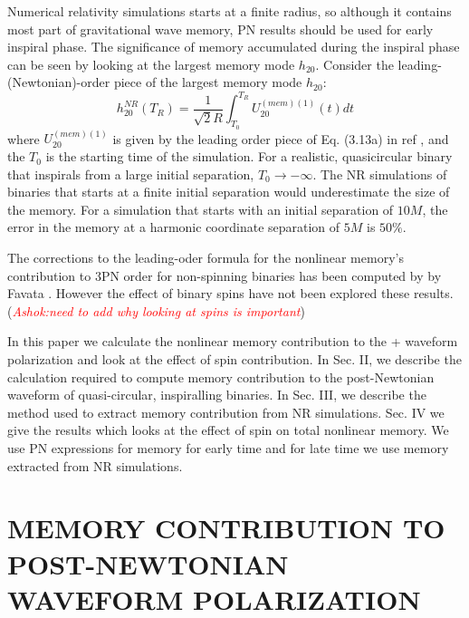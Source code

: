 \documentclass[prd,preprintnumbers,twocolumn,eqsecnum,floatfix,letter]{revtex4}
\newcommand{\ashok}[1]{\textcolor{red}{\textit{Ashok:#1}}}
\begin{document}
\par Numerical relativity simulations starts at a finite radius, so although it contains most part of gravitational wave memory, PN results should be used for early inspiral phase. The significance of memory accumulated during the inspiral phase can be seen by looking at the largest memory mode $h_{20}$. Consider the leading-(Newtonian)-order piece of the largest memory mode $h_{20}$:
\begin{equation}
	h^{NR}_{20}\left(T_R\right) = \frac{1}{\sqrt{2}R}\int_{T_0}^{T_R}U^{(mem)(1)}_{20}(t)dt
\end{equation}
where $U^{(mem)(1)}_{20}$ is given by the leading order piece of Eq. (3.13a) in ref \cite{Favata2009}, and the $T_0$ is the starting time of the simulation. For a realistic, quasicircular binary that inspirals from a large initial separation, $T_0 \rightarrow -\infty$. The NR simulations of binaries that starts at a finite initial separation would underestimate the size of the memory. For a simulation that starts with an initial separation of $10M$, the error in the memory at a harmonic coordinate separation of $5M$ is $50\%$.\cite{Favata2009} 

\par The corrections to the leading-oder formula for the nonlinear memory's contribution to 3PN order for non-spinning binaries has been computed by by Favata \cite{Favata2009}. However the effect of binary spins have not been explored these results.(\ashok{need to add why looking at spins is important})   
\par In this paper we calculate the nonlinear memory contribution to the + waveform polarization and look at the effect of spin contribution. In Sec. II, we describe the calculation required to compute memory contribution to the post-Newtonian waveform of quasi-circular, inspiralling binaries. In Sec. III, we describe the method used to extract memory contribution from NR simulations. Sec. IV we give the results which looks at the effect of spin on total nonlinear memory. We use PN expressions for memory for early time and for late time we use memory extracted from NR simulations.


\section{MEMORY CONTRIBUTION TO POST-NEWTONIAN WAVEFORM POLARIZATION}
\end{document}
